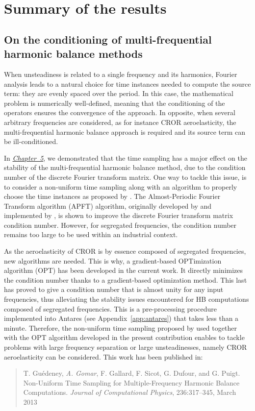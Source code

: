 \section*{Summary of the results}

\subsection*{On the conditioning of multi-frequential harmonic balance methods}

When unsteadiness is related to a single frequency and its
harmonics, Fourier analysis leads to a natural choice for time instances
needed to compute the source term:
they are evenly spaced over the period. In this case, the mathematical
problem is numerically well-defined, meaning that the conditioning of
the operators ensures the convergence of the approach.
In opposite, when several arbitrary frequencies are 
considered, as for instance CROR
aeroelasticity, the multi-frequential harmonic balance approach
is required and its source term can be ill-conditioned.

In \hyperref[cha:limitations_condition_number]{\emph{Chapter~5}},
we demonstrated that the time sampling has a major effect on the
stability of the multi-frequential harmonic balance 
method, due to the condition number of the discrete Fourier
transform matrix. One way to tackle this issue, 
is to consider a non-uniform time sampling
along with an algorithm to properly choose the time instances
as proposed by \citet{ThesisGuedeney}.
The Almost-Periodic Fourier Transform algorithm (APFT) 
algorithm, originally developed by \citet{Kundert1988} and implemented by 
\citet{ThesisGuedeney}, is shown to improve the discrete
Fourier transform matrix condition number.
However, for segregated frequencies, the condition number
remains too large to be used within an industrial context.

As the aeroelasticity of CROR is by essence
composed of segregated frequencies, new algorithms are needed.
This is why, a gradient-based OPTimization algorithm (OPT) 
has been developed in the current work.
It directly minimizes the condition number thanks to a
gradient-based optimization method. This last has proved to
give a condition number that is almost unity for any input frequencies,
thus alleviating the stability issues encountered for HB
computations composed of segregated frequencies.
This is a pre-processing procedure
implemented into Antares (see Appendix~\ref{app:antares})
that takes less than a minute.
Therefore, the non-uniform time sampling proposed by \citet{ThesisGuedeney}
used together with the OPT algorithm 
developed in the present contribution
enables to tackle problems with large frequency 
separation or large unsteadinesses, namely CROR aeroelasticity
can be considered.
This work has been published in:
\begin{quote}
	{\small T. Gu\'edeney, \emph{A. Gomar}, F. Gallard, F. Sicot, G. Dufour, and G. Puigt. 
	Non-Uniform Time Sampling for Multiple-Frequency Harmonic Balance Computations. 
	\emph{Journal of Computational Physics}, 236:317--345, March 2013}
\end{quote}


